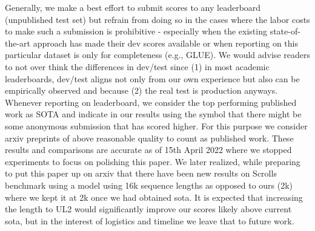 \documentclass[10pt]{article}
\begin{document}
Generally, we make a best effort to submit scores to any leaderboard (unpublished test set) but refrain from doing so in the cases where the labor costs to make such a submission is prohibitive - especially when the existing state-of-the-art approach has made their dev scores available or when reporting on this particular dataset is only for completeness (e.g., GLUE). We would advise readers to not over think the differences in dev/test since (1) in most academic leaderboards, dev/test aligns not only from our own experience but also can be empirically observed and because (2) the real test is production anyways. Whenever reporting on leaderboard, we consider the top performing published work as SOTA and indicate in our results using the  symbol that there might be some anonymous submission that has scored higher. For this purpose we consider arxiv preprints of above reasonable quality to count as published work. These results and comparisons are accurate as of 15th April 2022 where we stopped experiments to focus on polishing this paper. We later realized, while preparing to put this paper up on arxiv that there have been new results on Scrolls benchmark using a model \citep{guo2021longt5} using 16k sequence lengths as opposed to ours (2k) where we kept it at 2k once we had obtained sota. It is expected that increasing the length to UL2 would significantly improve our scores likely above current sota, but in the interest of logistics and timeline we leave that to future work. 
\end{document}
